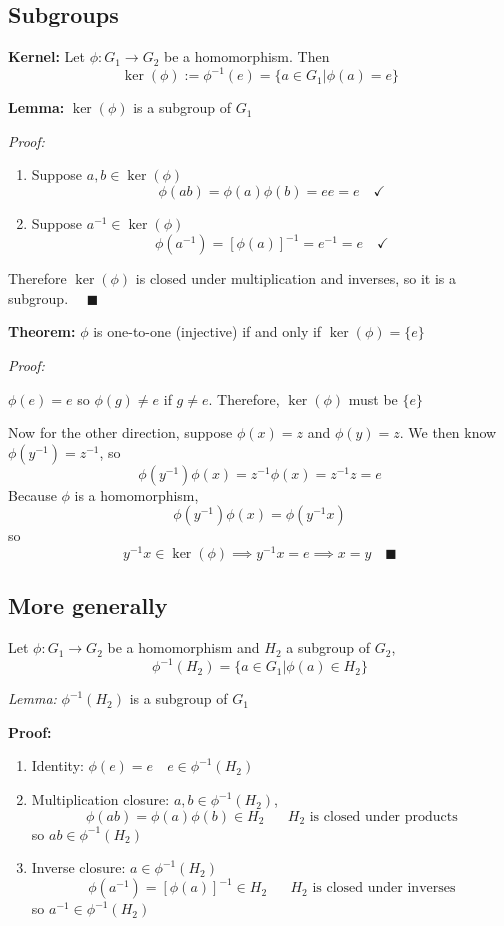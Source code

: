 \documentclass[12pt]{report}
\newcommand{\qed}{\quad \blacksquare}
\begin{document}
\subsection*{Subgroups}
\textbf{Kernel:} Let $\phi : G_1 \to G_2$ be a homomorphism. Then 
\[\ker(\phi) := \phi^{-1}(e) = \{a \in G_1 | \phi(a) = e\}\]

\textbf{Lemma:} $\ker(\phi)$ is a subgroup of $G_1$

\emph{Proof:}
\begin{enumerate}
    \item Suppose $a, b \in \ker(\phi)$
    \[\phi(ab) = \phi(a)\phi(b) = ee = e \quad \checkmark\]
    
    \item Suppose $a^{-1} \in \ker(\phi)$
    \[\phi(a^{-1}) = [\phi(a)]^{-1} = e^{-1} = e \quad \checkmark\]
\end{enumerate}
Therefore $\ker(\phi)$ is closed under multiplication and inverses, so it is a subgroup. $\qed$

\textbf{Theorem:} $\phi$ is one-to-one (injective) if and only if $\ker(\phi) = \{e\}$

\emph{Proof:}

$\phi(e) = e$ so $\phi(g) \neq e$ if $g \neq e$. Therefore, $\ker(\phi)$ must be $\{e\}$

Now for the other direction, suppose $\phi(x) = z$ and $\phi(y) = z$. We then know $\phi(y^{-1}) = z^{-1}$, so 
\[\phi(y^{-1})\phi(x) = z^{-1} \phi(x) = z^{-1}z = e\]
Because $\phi$ is a homomorphism, 
\[\phi(y^{-1}) \phi(x) = \phi(y^{-1}x)\]
so 
\[y^{-1}x \in \ker(\phi) \implies y^{-1}x = e \implies x = y \qed\]

\subsection*{More generally}
Let $\phi: G_1 \to G_2$ be a homomorphism and $H_2$ a subgroup of $G_2$, 
\[\phi^{-1}(H_2) = \{a\in G_1 | \phi(a) \in H_2\}\]

\emph{Lemma:} $\phi^{-1}(H_2)$ is a subgroup of $G_1$

\textbf{Proof:} 
\begin{enumerate}
    \item Identity: $\phi(e) = e \quad e \in \phi^{-1}(H_2)$
    \item Multiplication closure: $a, b \in \phi^{-1}(H_2)$, 
    \[\phi(ab) = \phi(a)\phi(b) \in H_2 \quad \text{ $H_2$ is closed under products}\]
    so $ab \in \phi^{-1}(H_2)$

    \item Inverse closure: $a \in \phi^{-1}(H_2)$ 
    \[\phi(a^{-1}) = [\phi(a)]^{-1} \in H_2 \quad \text{ $H_2$ is closed under inverses}\]
    so $a^{-1} \in \phi^{-1}(H_2)$
\end{enumerate}
\end{document}
